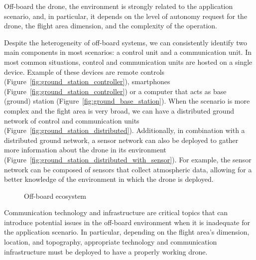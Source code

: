 Off-board the drone, the environment is strongly related to the application scenario, and, in particular, it depends on the level of 
autonomy request for the drone, the flight area dimension, and the complexity of the operation.

Despite the heterogeneity of off-board systems, we can consistently identify two main components in most scenarios: a control unit and a communication unit. 
In most common situations, control and communication units are hosted on a single device.
Example of these devices are remote controls (Figure~\ref{fig:ground_station_controller}), smartphones (Figure~\ref{fig:ground_station_controller})
or a computer that acts as base (ground) station (Figure~\ref{fig:ground_base_station}).
When the scenario is more complex and the fight area is very broad, 
we can have a distributed ground network of control and communication units (Figure~\ref{fig:ground_station_distributed}).
Additionally, in combination with a distributed ground network, a sensor network can also be deployed to gather more information about the drone in its environment (Figure~\ref{fig:ground_station_distributed_with_sensor}). 
For example, the sensor network can be composed of sensors that collect atmospheric data, allowing for a better knowledge of the environment in which the drone is deployed. 

\begin{figure}[h]
    \centering
    \quad
    \quad
    \quad
    \quad
    \caption[Off-board ecosystem]{Off-board ecosystem}\label{fig:off_board_ecosystem}
\end{figure}

Communication technology and infrastructure are critical topics that can introduce potential issues 
in the off-board environment when it is inadequate for the application scenario.
In particular, depending on the flight area's dimension, location, and topography, appropriate technology and communication infrastructure must be deployed to have a properly working drone.

